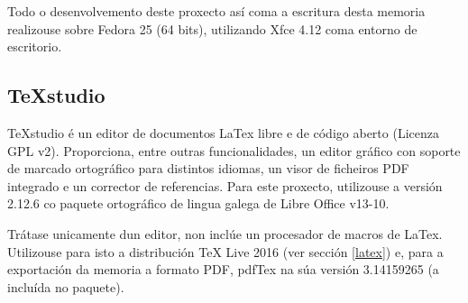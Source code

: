 Todo o desenvolvemento deste proxecto así coma a escritura desta memoria realizouse sobre Fedora 25 (64 bits), utilizando Xfce 4.12 coma entorno de escritorio.


\subsection{TeXstudio}

TeXstudio é un editor de documentos LaTex libre e de código aberto (Licenza GPL v2\cite{texstudio}). Proporciona, entre outras funcionalidades, un editor gráfico con soporte de marcado ortográfico para distintos idiomas, un visor de ficheiros PDF integrado e un corrector de referencias. Para este proxecto, utilizouse a versión 2.12.6 co paquete ortográfico de lingua galega de Libre Office v13-10.

Trátase unicamente dun editor, non inclúe un procesador de macros de LaTex. Utilizouse para isto a distribución TeX Live 2016 (ver sección \ref{latex}) e, para a exportación da memoria a formato PDF, pdfTex na súa versión 3.14159265 (a incluída no paquete).